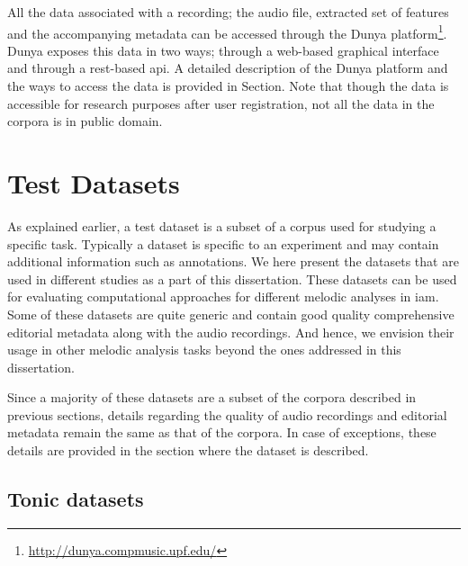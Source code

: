 All the data associated with a recording; the audio file, extracted set of features and the accompanying metadata can be accessed through the Dunya platform\footnote{\url{http://dunya.compmusic.upf.edu/}}. Dunya exposes this data in two ways; through a web-based graphical interface and through a \acrshort{rest}-based \acrshort{api}. A detailed description of the Dunya platform and the ways to access the data is provided in Section. Note that though the data is accessible for research purposes after user registration, not all the data in the corpora is in public domain. 



\section{Test Datasets}
\label{sec:corpus_test_datasets}

As explained earlier, a test dataset is a subset of a corpus used for studying a specific task. Typically a dataset is specific to an experiment and may contain additional information such as annotations. We here present the datasets that are used in different studies as a part of this dissertation. These datasets can be used for evaluating computational approaches for different melodic analyses in \gls{iam}. Some of these datasets are quite generic and contain good quality comprehensive editorial metadata along with the audio recordings. And hence, we envision their usage in other melodic analysis tasks beyond the ones addressed in this dissertation.

Since a majority of these datasets are a subset of the corpora described in previous sections, details regarding the quality of audio recordings and editorial metadata remain the same as that of the corpora. In case of exceptions, these details are provided in the section where the dataset is described. 


\subsection{Tonic datasets}
\label{sec:corpus_tonic_datasets}


